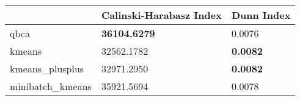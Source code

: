 \begin{table}[htbp]
\centering
\begin{tabular}{lll}
\toprule
 & Calinski-Harabasz Index & Dunn Index \\
\midrule
qbca & \textbf{36104.6279} & 0.0076 \\
kmeans & 32562.1782 & \textbf{0.0082} \\
kmeans_plusplus & 32971.2950 & \textbf{0.0082} \\
minibatch_kmeans & 35921.5694 & 0.0078 \\
\bottomrule
\end{tabular}
\end{table}
